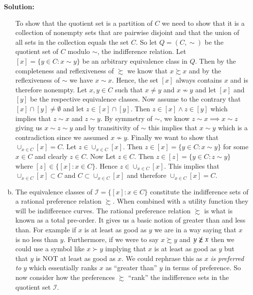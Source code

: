 \documentclass[a4paper,11pt]{article}
\newenvironment{solution}{ \noindent \textbf{Solution: \medskip}}{}
\begin{document}
\begin{solution}
\begin{enumerate}[(a)]
		To show that the quotient set is a partition of $C$ we need to show that it is a collection of nonempty sets that are pairwise disjoint and that the union of all sets in the collection equals the set $C$.
		So let $Q = (C,\sim)$ be the quotient set of $C$ modulo $\sim$, the indifference relation.
		Let $[x] = \{ y \in C: x \sim y\}$ be an arbitrary equivalence class in $Q$.
		Then by the completeness and reflexiveness of $\succsim$ we know that $x \succsim x$ and by the reflexiveness of $\sim$ we have $x\sim x$.
		Hence, the set $[x]$ always contains $x$ and is therefore nonempty.
		Let $x,y \in C$ such that $x\neq y$ and $x \nsim y$ and let $[x]$ and $[y]$ be the respective equivalence classes.
		Now assume to the contrary that $[x]\cap [y] \neq \emptyset$ and let $z \in [x]\cap[y]$.
		Then $z \in [x] \wedge z \in [y]$ which implies that $z \sim x$ and $z \sim y$.
		By symmetry of $\sim$, we know $z \sim x \implies x \sim z$ giving us $ x \sim z \sim y$ and by transitivity of $\sim$ this implies that $x \sim y$ which is a contradiction since we assumed $x \nsim y$.
		Finally we want to show that $\cup_{x \in C} [x] = C$.
		Let $z \in \cup_{x\in C}[x]$.
		Then $z \in [x] = \{ y \in C: x \sim y\}$ for some $x \in C$ and clearly $z \in C$.
		Now Let $z \in C$.
		Then $z \in [z] = \{ y \in C: z \sim y \}$ where $[z] \in \{ [x]: x \in C\}$.
		Hence $z \in \cup_{x \in C}[x]$.
		This implies that $\cup_{x\in C}[x] \subset C$ and $C \subset \cup_{x\in C}[x]$ and therefore $\cup_{x \in C}[x] = C$. \qedsymbol
		\item The equivalence classes of $\mathcal{I} = \{[x]: x \in C\}$ constitute the indifference sets of a rational preference relation $\succsim$.
		When combined with a utility function they will be indifference curves.
		The rational preference relation $\succsim$ is what is known as a total pre-order.
		It gives us a basic notion of greater than and less than.
		For example if $x$ is at least as good as $y$ we are in a way saying that $x$ is no less than $y$.
		Furthermore, if we were to say $x\succsim y$ and $y \nsuccsim x$ then we could use a symbol like $x \succ y$ implying that $x$ is at least as good as $y$ but that $y$ is NOT at least as good as $x$.
		We could rephrase this as $x$ \emph{is preferred to} $y$ which essentially ranks $x$ as ``greater than'' $y$ in terms of preference.
		So now consider how the preferences $\succsim$ ``rank'' the indifference sets in the quotient set $\mathcal{I}$.
		

\end{enumerate}
\end{solution}
\end{document}
